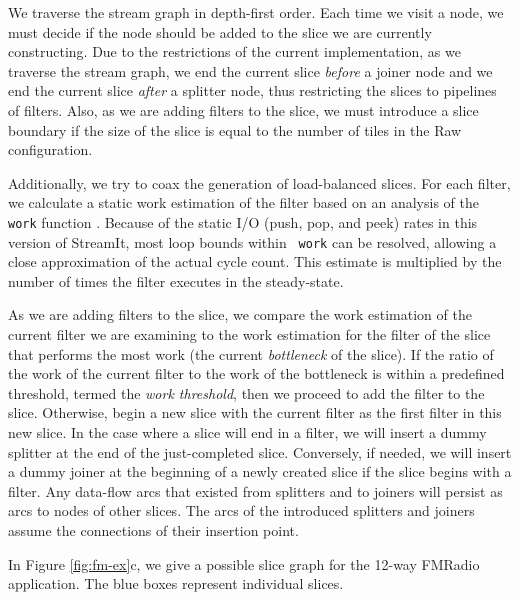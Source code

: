 We traverse the stream graph in depth-first order.  Each time we visit
a node, we must decide if the node should be added to the slice we are
currently constructing.  Due to the restrictions of the current
implementation, as we traverse the stream graph, we end the current
slice {\it before} a joiner node and we end the current slice {\it
after} a splitter node, thus restricting the slices to pipelines of
filters.  Also, as we are adding filters to the slice, we must
introduce a slice boundary if the size of the slice is equal to the
number of tiles in the Raw configuration.

Additionally, we try to coax the generation of load-balanced slices.
For each filter, we calculate a static work estimation of the filter
based on an analysis of the {\tt work} function
\cite{streamit-asplos}.  Because of the static I/O (push, pop, and
peek) rates in this version of StreamIt, most loop bounds within {\tt
work} can be resolved, allowing a close approximation of the actual
cycle count.  This estimate is multiplied by the number of times the
filter executes in the steady-state.

As we are adding filters to the slice, we compare the work estimation
of the current filter we are examining to the work estimation for the
filter of the slice that performs the most work (the current {\it
bottleneck} of the slice).  If the ratio of the work of the current
filter to the work of the bottleneck is within a predefined threshold,
termed the {\it work threshold}, then we proceed to add the filter to
the slice.  Otherwise, begin a new slice with the current filter as
the first filter in this new slice. In the case where a slice will end
in a filter, we will insert a dummy splitter at the end of the
just-completed slice.  Conversely, if needed, we will insert a dummy
joiner at the beginning of a newly created slice if the slice begins
with a filter. Any data-flow arcs that existed from splitters and to
joiners will persist as arcs to nodes of other slices.  The arcs of
the introduced splitters and joiners assume the connections of their
insertion point.

In Figure \ref{fig:fm-ex}c, we give a possible slice graph for the
12-way FMRadio application.  The blue boxes represent individual
slices.

